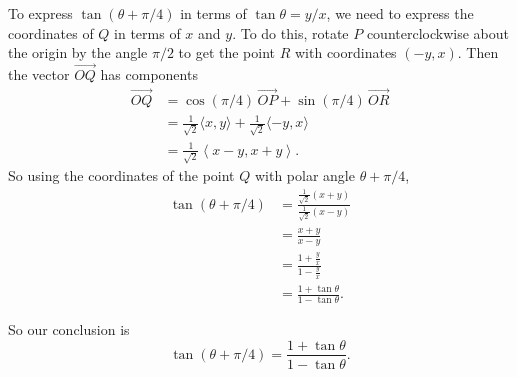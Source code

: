 \documentclass{ximera}
\begin{document}
\begin{question}
\begin{explanation}
\begin{enumerate}
To express $\tan(\theta + \pi/4)$ in terms of $\tan\theta = y/x$, we need to express the coordinates of $Q$ in terms of $x$ and $y$. To do this, rotate $P$ counterclockwise about the origin by the angle $\pi/2$ to get the point $R$ with coordinates $(-y,x)$. Then the vector $\overrightarrow{OQ}$ has components
\begin{align*}
  \overrightarrow{OQ} &= \cos (\pi/4) \, \overrightarrow{OP} +  \sin (\pi/4) \, \overrightarrow{OR} \\
                                 &=\frac{1}{\sqrt{2}} \langle x , y \rangle + \frac{1}{\sqrt{2}} \langle -y , x \rangle \\
                                 &= \frac{1}{\sqrt{2}}\left \langle x - y   , x + y\right \rangle .
\end{align*}
So using the coordinates of the point $Q$ with polar angle $\theta + \pi/4$, 
\begin{align*}
  \tan(\theta + \pi/4) &= \frac{\frac{1}{\sqrt{2}}\left( x + y \right)}{\frac{1}{\sqrt{2}}\left( x - y \right)} \\
                               &= \frac{x+y}{x-y} \\
                               &= \frac{1 + \frac{y}{x}}{1- \frac{y}{x}} \\
                               &= \frac{1 + \tan\theta}{1 - \tan\theta}.
\end{align*}

So our conclusion is
\[
  \tan(\theta + \pi/4) = \frac{1 + \tan\theta}{1 - \tan\theta}.
\]

\end{enumerate}
\end{explanation}
\end{question}
\end{document}
